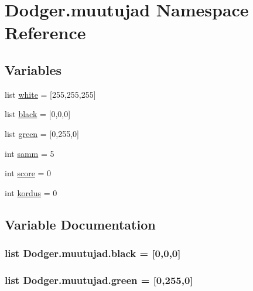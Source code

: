 \hypertarget{namespace_dodger_1_1muutujad}{}\section{Dodger.\+muutujad Namespace Reference}
\label{namespace_dodger_1_1muutujad}
\subsection*{Variables}
\begin{DoxyCompactItemize}
\item 
list \hyperlink{namespace_dodger_1_1muutujad_a950ccd86c2731c52ece948ce302c6f96}{white} = \mbox{[}255,255,255\mbox{]}
\item 
list \hyperlink{namespace_dodger_1_1muutujad_a443de8a68ebc1f25f1595be74116ba7c}{black} = \mbox{[}0,0,0\mbox{]}
\item 
list \hyperlink{namespace_dodger_1_1muutujad_a9a3c4c00825bcf1180f94222380aef68}{green} = \mbox{[}0,255,0\mbox{]}
\item 
int \hyperlink{namespace_dodger_1_1muutujad_ae7c3ed6b4ef11513d11310b665039cd1}{samm} = 5
\item 
int \hyperlink{namespace_dodger_1_1muutujad_a9607e1aed5a091af3b0c14ec1beab289}{score} = 0
\item 
int \hyperlink{namespace_dodger_1_1muutujad_ad597bc6d76e9941c159e6ea9fb6695ba}{kordus} = 0
\end{DoxyCompactItemize}


\subsection{Variable Documentation}
\hypertarget{namespace_dodger_1_1muutujad_a443de8a68ebc1f25f1595be74116ba7c}{}
\subsubsection[{black}]{\setlength{\rightskip}{0pt plus 5cm}list Dodger.\+muutujad.\+black = \mbox{[}0,0,0\mbox{]}}\label{namespace_dodger_1_1muutujad_a443de8a68ebc1f25f1595be74116ba7c}
\hypertarget{namespace_dodger_1_1muutujad_a9a3c4c00825bcf1180f94222380aef68}{}
\subsubsection[{green}]{\setlength{\rightskip}{0pt plus 5cm}list Dodger.\+muutujad.\+green = \mbox{[}0,255,0\mbox{]}}\label{namespace_dodger_1_1muutujad_a9a3c4c00825bcf1180f94222380aef68}
\hypertarget{namespace_dodger_1_1muutujad_ad597bc6d76e9941c159e6ea9fb6695ba}{}
